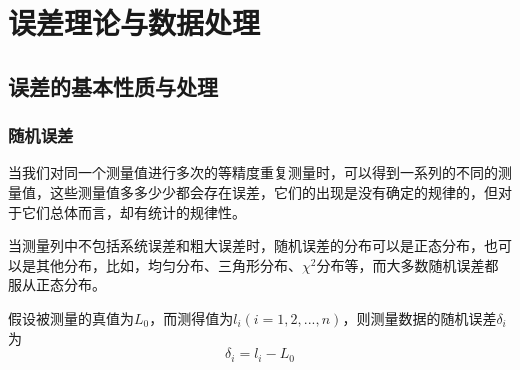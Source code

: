 \section{误差理论与数据处理}
\subsection{误差的基本性质与处理}
\subsubsection{随机误差}
当我们对同一个测量值进行多次的等精度重复测量时，可以得到一系列的不同的测量值，这些测量值多多少少都会存在误差，它们的出现是没有确定的规律的，但对于它们总体而言，却有统计的规律性。

当测量列中不包括系统误差和粗大误差时，随机误差的分布可以是正态分布，也可以是其他分布，比如，均匀分布、三角形分布、$ \chi^2 $分布等，而大多数随机误差都服从正态分布。

假设被测量的真值为$ L_0 $，而测得值为$ l_i(i=1,2,...,n) $，则测量数据的随机误差$ \delta_i $为\[ \delta_i=l_i-L_0 \]

